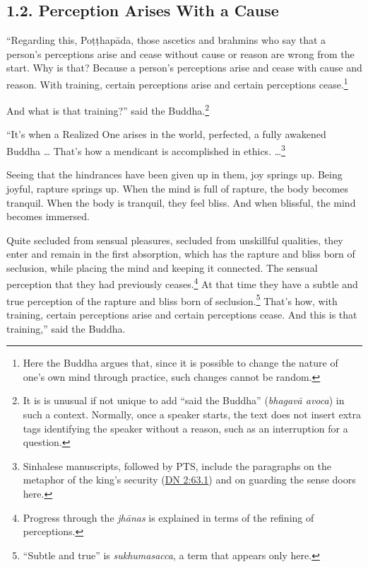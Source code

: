 \documentclass[12pt,openany]{book}%
\begin{document}
\subsection*{1.2. Perception Arises With a Cause }

“Regarding this, \textsanskrit{Poṭṭhapāda}, those ascetics and brahmins who say that a person’s perceptions arise and cease without cause or reason are wrong from the start. Why is that? Because a person’s perceptions arise and cease with cause and reason. With training, certain perceptions arise and certain perceptions cease.\footnote{Here the Buddha argues that, since it is possible to change the nature of one’s own mind through practice, such changes cannot be random. } 

And what is that training?” said the Buddha.\footnote{It is is unusual if not unique to add “said the Buddha” (\textit{\textsanskrit{bhagavā} avoca}) in such a context. Normally, once a speaker starts, the text does not insert extra tags identifying the speaker without a reason, such as an interruption for a question. } 

“It’s when a Realized One arises in the world, perfected, a fully awakened Buddha … That’s how a mendicant is accomplished in ethics. …\footnote{Sinhalese manuscripts, followed by PTS, include the paragraphs on the metaphor of the king’s security (\href{https://suttacentral.net/dn2/en/sujato\#63.1}{DN 2:63.1}) and on guarding the sense doors here. } 

Seeing that the hindrances have been given up in them, joy springs up. Being joyful, rapture springs up. When the mind is full of rapture, the body becomes tranquil. When the body is tranquil, they feel bliss. And when blissful, the mind becomes immersed. 

Quite secluded from sensual pleasures, secluded from unskillful qualities, they enter and remain in the first absorption, which has the rapture and bliss born of seclusion, while placing the mind and keeping it connected. The sensual perception that they had previously ceases.\footnote{Progress through the \textit{\textsanskrit{jhānas}} is explained in terms of the refining of perceptions. } At that time they have a subtle and true perception of the rapture and bliss born of seclusion.\footnote{“Subtle and true” is \textit{sukhumasacca}, a term that appears only here. } That’s how, with training, certain perceptions arise and certain perceptions cease. And this is that training,” said the Buddha. 
\end{document}
